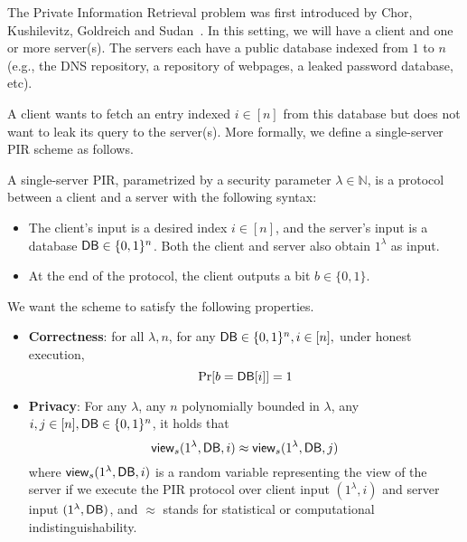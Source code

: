 
The Private Information Retrieval problem was first introduced by Chor, Kushilevitz, Goldreich and Sudan~\cite{chor1998private}.
In this setting, we will have a client and 
one or more server(s). The servers each have a public database indexed from $1$ to $n$ (e.g., the DNS repository, 
a repository of webpages, a leaked password database, etc).

A client wants to fetch an entry 
indexed $i \in [n]$ 
from this database 
but does not want to leak its query to the server(s). More formally,
we define a single-server PIR scheme as follows.

\begin{definition}
A single-server PIR, parametrized
by a security parameter $\lambda \in \mathbb{N}$, is a 
protocol between a client and a server with the following
syntax: 
\begin{itemize}
	\item The client's input is a desired 
index $i \in [n]$, and the server's input is a database ${\sf DB} \in \{0,1\}^n$.
Both the client and server also obtain $1^\lambda$ as input. 
	\item At the end of the protocol, the client outputs a bit $b \in \{0,1\}$.
\end{itemize}

We want the scheme to satisfy the following properties.
\begin{itemize}
\item \textbf{Correctness}: for all $\lambda, n$, 
for any ${\sf DB} \in \{0,1\}^n, i \in [n],$ under honest execution, 
	\[\Pr[b = \DB[i]] = 1 %
\]
	
\item \textbf{Privacy}: For any $\lambda$, 
any $n$ polynomially bounded in $\lambda$, any 
$i,j \in [n], {\sf DB}  \in \{0,1\}^n$, 
it holds that  
	\[{\sf view}_s(1^\lambda, {\sf DB},i) \approx {\sf view}_s(1^\lambda, {\sf DB},j)\]
where ${\sf view}_{s}(1^\lambda, {\sf DB}, i)$ 
is a random variable representing the view of the server  
if we execute the PIR protocol 
over client input $(1^\lambda, i)$ and server input $(1^\lambda, {\sf DB})$, 
and $\approx$ stands for 
statistical or computational indistinguishability.
\end{itemize}
\end{definition}

